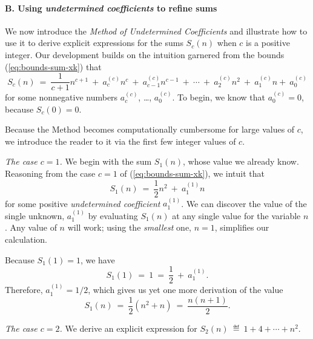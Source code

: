 \paragraph{\small\sf B. Using {\em undetermined coefficients} to refine sums}

We now introduce the {\em Method of Undetermined Coefficients}
and illustrate how to use it to derive explicit expressions for the
sums $S_c(n)$ when $c$ is a positive integer.  Our development builds
on the intuition garnered from the bounds (\ref{eq:bounds-sum-xk})
that
\[ S_c(n) \ = \ \frac{1}{c+1} n^{c+1} \ + \ a^{(c)}_c n^c \ + \
a^{(c)}_{c-1} n^{c-1} \ + \ \cdots \ + \ a^{(c)}_2 n^2 \ + \ a^{(c)}_1 n
 + \ a^{(c)}_0
\]
for some nonnegative numbers  
$a^{(c)}_c$, \ldots,
$a^{(c)}_0$.  To begin, we know that $a^{(c)}_0 = 0$, because $S_c(0)
= 0$.
\medskip

\noindent {}
\medskip

Because the Method becomes computationally cumbersome for large values
of $c$, we introduce the reader to it via the first few integer values
of $c$.

{\it The case $c=1$.}
%
We begin with the sum $S_1(n)$, whose value we already know.
Reasoning from the case $c=1$ of (\ref{eq:bounds-sum-xk}), we intuit
that
\[ S_1(n) \ = \ \frac{1}{2} n^2 \ + \ a^{(1)}_1 n \]
for some positive {\it undetermined coefficient} $a^{(1)}_1$.  We can
discover the value of the single unknown, $a^{(1)}_1$ by evaluating
$S_1(n)$ at any single value for the variable $n$.  Any value of $n$
will work; using the {\em smallest} one, $n=1$, simplifies our
calculation.

Because $S_1(1) = 1$, we have
\[ S_1(1) \ = \ 1 \ = \ \frac{1}{2} \ + \ a^{(1)}_1. \]
Therefore, $a^{(1)}_1 = 1/2$, which gives us yet one more derivation
of the value
\[ S_1(n) \ = \ \frac{1}{2} \left( n^2 + n \right) \ = \ 
\frac{n(n+1)}{2}.
\]

\medskip

{\it The case $c=2$.}
%
We derive an explicit expression for $S_2(n) \ \eqdef \  1 + 4 +
\cdots + n^2$.

